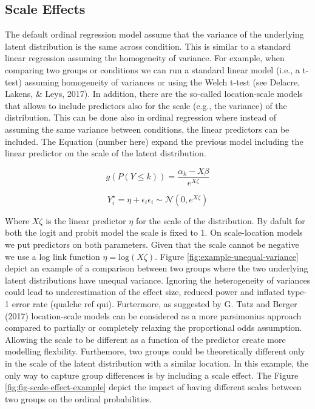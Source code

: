 \documentclass[
  man,floatsintext]{apa6}
\begin{document}
\normalsize

\subsection{Scale Effects}\label{scale-effects}

The default ordinal regression model assume that the variance of the underlying latent distribution is the same across condition. This is similar to a standard linear regression assuming the homogeneity of variance. For example, when comparing two groups or conditions we can run a standard linear model (i.e., a t-test) assuming homogeneity of variances or using the Welch t-test (see Delacre, Lakens, \& Leys, 2017). In addition, there are the so-called location-scale models that allows to include predictors also for the scale (e.g., the variance) of the distribution. This can be done also in ordinal regression where instead of assuming the same variance between conditions, the linear predictors can be included. The Equation (number here) expand the previous model including the linear predictor on the scale of the latent distribution.

\begin{equation}
g(P(Y \leq k)) = \frac{\alpha_k - X\beta}{e^{X\zeta}}
\end{equation}

\begin{equation} 
Y^\star_i = \eta + \epsilon_i
\epsilon_i \sim \mathcal{N}(0, e^{X\zeta})
\end{equation}

Where \(X\zeta\) is the linear predictor \(\eta\) for the scale of the distribution. By dafult for both the logit and probit model the scale is fixed to 1. On scale-location models we put predictors on both parameters. Given that the scale cannot be negative we use a log link function \(\eta = \text{log}(X\zeta)\). Figure \ref{fig:example-unequal-variance} depict an example of a comparison between two groups where the two underlying latent distributions have unequal variance. Ignoring the heterogeneity of variances could lead to underestimation of the effect size, reduced power and inflated type-1 error rate (qualche ref qui). Furtermore, as suggested by G. Tutz and Berger (2017) location-scale models can be considered as a more parsimonius approach compared to partially or completely relaxing the proportional odds assumption. Allowing the scale to be different as a function of the predictor create more modelling flexbility. Furthemore, two groups could be theoretically different only in the scale of the latent distribution with a similar location. In this example, the only way to capture group differences is by including a scale effect. The Figure \ref{fig:fig-scale-effect-example} depict the impact of having different scales between two groups on the ordinal probabilities.
\end{document}
